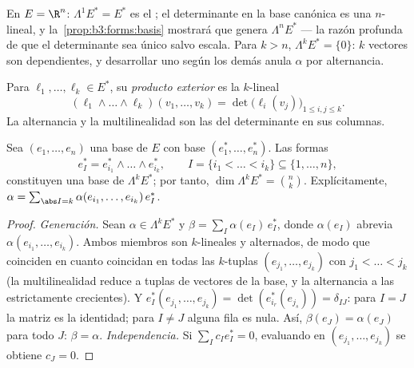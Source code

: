 \begin{example}
En $E = \R^n$: $\Lambda^1E^* = E^*$ es el
; el determinante en la
base canónica es una 
$n$-lineal, y la~\cref{prop:b3:forms:basis} mostrará que genera
$\Lambda^nE^*$ --- la razón profunda de que el determinante sea único
salvo escala. Para $k > n$, $\Lambda^kE^* = \{0\}$: $k$ vectores son
dependientes, y desarrollar uno según los demás anula $\alpha$ por
alternancia.
\end{example}

\begin{definition}\label{def:b3:forms:wedge}
Para $\ell_1, \dots, \ell_k \in E^*$, su \emph{producto
exterior} es la
 $k$-lineal
\[
(\ell_1 \wedge \dots \wedge \ell_k)(v_1, \dots, v_k)
= \det\bigl(\ell_i(v_j)\bigr)_{1 \leq i, j \leq k} .
\]
La alternancia y la multilinealidad son las del determinante en sus
columnas.
\end{definition}

\begin{proposition}\label{prop:b3:forms:basis}
Sea $(e_1, \dots, e_n)$ una base de $E$ con base
 $(e_1^*, \dots, e_n^*)$. Las
formas
\[
e_I^* = e_{i_1}^* \wedge \dots \wedge e_{i_k}^*,
\qquad I = \{i_1 < \dots < i_k\} \subseteq \{1, \dots, n\},
\]
constituyen una base de $\Lambda^kE^*$; por tanto, $\dim\Lambda^kE^* =
\binom nk$. Explícitamente, $\alpha =
\sum_{\abs I = k}\alpha(e_{i_1}, \dots, e_{i_k})\,e_I^*$.
\end{proposition}

\begin{proof}
\emph{Generación.} Sean $\alpha \in \Lambda^kE^*$ y $\beta =
\sum_I\alpha(e_I)\,e_I^*$, donde $\alpha(e_I)$ abrevia
$\alpha(e_{i_1}, \dots, e_{i_k})$. Ambos miembros son $k$-lineales y
alternados, de modo que coinciden en cuanto coincidan en todas las
$k$-tuplas $(e_{j_1}, \dots, e_{j_k})$ con $j_1 < \dots <
j_k$ (la multilinealidad reduce a tuplas de vectores de la base, y la
alternancia a las estrictamente crecientes). Y $e_I^*(e_{j_1},
\dots, e_{j_k}) = \det(e_{i_r}^*(e_{j_s})) = \delta_{IJ}$: para $I = J$
la matriz es la identidad; para $I \neq J$ alguna fila es nula. Así,
$\beta(e_J) = \alpha(e_J)$ para todo $J$: $\beta = \alpha$.
\emph{Independencia.} Si $\sum_I c_Ie_I^* = 0$, evaluando en
$(e_{j_1}, \dots, e_{j_k})$ se obtiene $c_J = 0$.
\end{proof}

